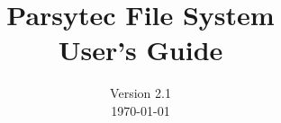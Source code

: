 \makeindex


\title{\Huge  Parsytec File System \\
       \huge  User's Guide}
\date{\large Version 2.1 \\
      \today}
\author{}

\def\HE{{\tt /he\-li\-os\slash etc}}
\def\DI{{\tt dev\-in\-fo}}
\def\DIS{\DI{\tt .src}}
\def\HEDI{\HE{\tt \slash}\DI}
\def\HEDIS{\HE{\tt \slash}\DIS}
\def\SI{{\tt scsi\-in\-fo}}
\def\SIS{\SI{\tt .src}}
\def\HESI{\HE{\tt \slash}\SI}
\def\HESIS{\HE{\tt\slash}\SIS}
\def\registered{{\ooalign
   {\hfil\raise.07ex\hbox{\scriptsize R}\hfil\crcr\mathhexbox20D}}}
\def\trademark{$^{\rm TM}$}
\def\man{\begin{tabular}{lp{11cm}}}
\def\PP{   {\bf Purpose:}     & }
\def\FO{\\ {\bf Format:}      & }
\def\DE{\\ {\bf Description:} & }
\def\SA{\\ {\bf See also:}    & }
\def\endman{\end{tabular}\newpage}
\def\note{\begin{description}\item {\bf NOTE:}\newline}%
\def\endnote{\end{description}}
\def\caution{\begin{description}\item {\bf CAUTION:}\newline}
\def\endcaution{\end{description}}


\maketitle

\pagestyle{empty}

\newpage

\setcounter{page}{0}
\pagestyle{headings}
\setcounter{secnumdepth}{6}
\setcounter{tocdepth}{6}
\tableofcontents
\listoffigures

\def\listing{\pagebreak[2]\small}         %
\def\endlisting{\pagebreak[2]}
\def\screendump{\pagebreak[2]\small}         %
\def\endscreendump{\pagebreak[2]}

